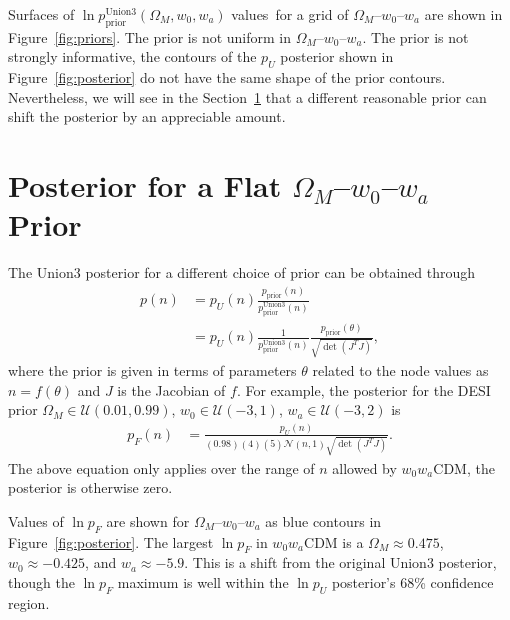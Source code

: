 \documentclass[11pt,a4paper]{article}
\begin{document}
Surfaces of  $\ln{p^\text{Union3}_\text{prior}}(\Omega_M, w_0,w_a)$ values\ for a grid of $\Omega_M$--$w_0$--$w_a$ are shown in
Figure~\ref{fig:priors}.   The prior is not uniform in  $\Omega_M$--$w_0$--$w_a$.
The prior is not strongly informative, the contours of the $p_U$
posterior shown in Figure~\ref{fig:posterior} do not have the same shape of the prior contours.  Nevertheless,
we will see in the  Section~\ref{sec:flatposterior} that a different reasonable prior can shift the posterior
by an appreciable amount.

\section{Posterior for a Flat  $\Omega_M$--$w_0$--$w_a$  Prior}
\label{sec:flatposterior}
The Union3  posterior for a different choice of prior can be obtained through
\begin{align}
p(n) & = p_U(n)\frac{p_\text{prior}(n)}{p^\text{Union3}_\text{prior}(n)}\\
 & = p_U(n) \frac{1}{p^\text{Union3}_\text{prior}(n) } \frac{p_\text{prior}(\theta)}{ \sqrt{\det{\left(J^T J\right)}}} ,
\end{align}
where the prior is given in terms of parameters $\theta$
related to the node values as $n=f(\theta)$ and $J$ is the Jacobian of $f$.
For example, 
the posterior for the 
DESI prior $\Omega_M \in \mathcal{U}(0.01,0.99)$, $w_0 \in \mathcal{U}(-3,1)$, $w_a \in \mathcal{U}(-3,2)$
is
\begin{align}
p_F(n) 
& = \frac{p_U(n)}{(0.98)(4)(5) \mathcal{N}(n,1)  \sqrt{\det{\left(J^T J\right)}}}.
\label{eq:flatprior}
\end{align}
The above equation only applies over the range of $n$ allowed by  $w_0w_a$CDM, the posterior is otherwise zero.


Values of $\ln{p}_F$ are shown for  $\Omega_M$--$w_0$--$w_a$ as blue contours in Figure~\ref{fig:posterior}.
The largest $\ln{p_F}$ in $w_0w_a$CDM is a $\Omega_M\approx 0.475$, $w_0 \approx -0.425$, and $w_a \approx -5.9$.  This is a shift from the original Union3 posterior, though  the $\ln{p_F}$ maximum is well within
the $\ln{p_U}$ posterior's 68\% confidence region.
\end{document}
